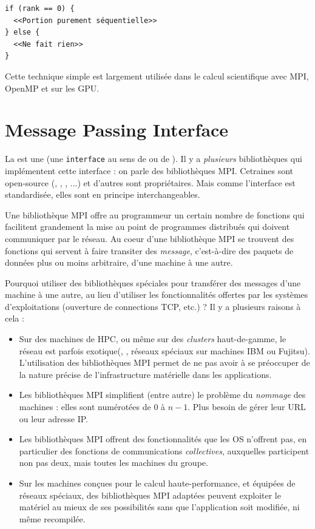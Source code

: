 \begin{verbatim}
if (rank == 0) {
  <<Portion purement séquentielle>>
} else {
  <<Ne fait rien>>
}
\end{verbatim}

Cette technique simple est largement utilisée dans le calcul scientifique avec
\textsf{MPI}, \textsf{OpenMP} et sur les GPU.



\chapter{Message Passing Interface}
\label{chap:mpi}

La  est une  (une
\texttt{interface} au sens de  ou de ). Il y a
\emph{plusieurs} bibliothèques qui implémentent cette interface : on parle des
bibliothèques MPI. Cetraines sont open-source (,
, , ...) et d'autres sont propriétaires. Mais
comme l'interface est standardisée, elles sont en principe interchangeables.

Une bibliothèque MPI offre au programmeur un certain nombre de fonctions
qui facilitent grandement la mise au point de programmes distribués
qui doivent communiquer par le réseau. Au coeur d'une bibliothèque MPI se
trouvent des fonctions qui servent à faire transiter des
\emph{message}, c'est-à-dire des paquets de données plus ou moins
arbitraire, d'une machine à une autre.

Pourquoi utiliser des bibliothèques spéciales pour transférer des
messages d'une machine à une autre, au lieu d'utiliser les
fonctionnalités offertes par les systèmes d'exploitations (ouverture
de connections TCP, etc.) ? Il y a plusieurs raisons à cela :

\begin{itemize}
\item Sur des machines de HPC, ou même sur des \emph{clusters} haut-de-gamme, le
  réseau est parfois \og exotique\fg (, ,
  réseaux spéciaux sur machines IBM ou Fujitsu). L'utilisation des bibliothèques
  MPI permet de ne pas avoir à se préoccuper de la nature précise de
  l'infrastructure matérielle dans les applications.

\item Les bibliothèques MPI simplifient (entre autre) le problème du
  \emph{nommage} des machines : elles sont numérotées de $0$ à $n-1$. Plus
  besoin de gérer leur URL ou leur adresse IP.

\item Les bibliothèques MPI offrent des fonctionnalités que les OS n'offrent
  pas, en particulier des fonctions de communications \emph{collectives},
  auxquelles participent non pas deux, mais toutes les machines du groupe.

\item Sur les machines conçues pour le calcul haute-performance, et
  équipées de réseaux spéciaux, des bibliothèques MPI adaptées peuvent
  exploiter le matériel au mieux de ses possibilités sans que
  l'application soit modifiée, ni même recompilée.
\end{itemize}

